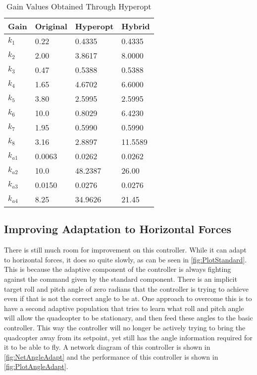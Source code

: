 \documentclass[letterpaper,12pt,titlepage,oneside,final]{book}
\begin{document}
\begin{table}
\caption{Gain Values Obtained Through Hyperopt} \label{table:hyperopt_gains}
\begin{center}
\begin{tabular}{| l | l | l | l |}

\hline
\textbf{Gain} & \textbf{Original} & \textbf{Hyperopt} & \textbf{Hybrid} \\ \hline
$k_{1}$ & 0.22 & 0.4335 & 0.4335 \\ \hline
$k_{2}$ & 2.00 & 3.8617 & 8.0000 \\ \hline
$k_{3}$ & 0.47 & 0.5388 & 0.5388 \\ \hline
$k_{4}$ & 1.65 & 4.6702 & 6.6000 \\ \hline
$k_{5}$ & 3.80 & 2.5995 & 2.5995 \\ \hline 
$k_{6}$ & 10.0 & 0.8029 & 6.4230 \\ \hline 
$k_{7}$ & 1.95 & 0.5990 & 0.5990 \\ \hline 
$k_{8}$ & 3.16 & 2.8897 & 11.5589 \\ \hline 
$k_{a1}$ & 0.0063 & 0.0262 & 0.0262 \\ \hline 
$k_{a2}$ & 10.0 & 48.2387 & 26.00 \\ \hline 
$k_{a3}$ & 0.0150 & 0.0276 & 0.0276 \\ \hline 
$k_{a4}$ & 8.25 & 34.9626 & 21.45 \\ \hline 


\end{tabular}
\end{center}
\end{table}




\subsection{Improving Adaptation to Horizontal Forces}

There is still much room for improvement on this controller. 
While it can adapt to horizontal forces, it does so quite slowly, as can be seen in \autoref{fig:PlotStandard}. 
This is because the adaptive component of the controller is always fighting against the command given by the standard component. 
There is an implicit target roll and pitch angle of zero radians that the controller is trying to achieve even if that is not the correct angle to be at. 
One approach to overcome this is to have a second adaptive population that tries to learn what roll and pitch angle will allow the quadcopter to be stationary, and then feed these angles to the basic controller. 
This way the controller will no longer be actively trying to bring the quadcopter away from its setpoint, yet still has the angle information required for it to be able to fly. 
A network diagram of this controller is shown in \autoref{fig:NetAngleAdapt} and the performance of this controller is shown in \autoref{fig:PlotAngleAdapt}.
\end{document}
